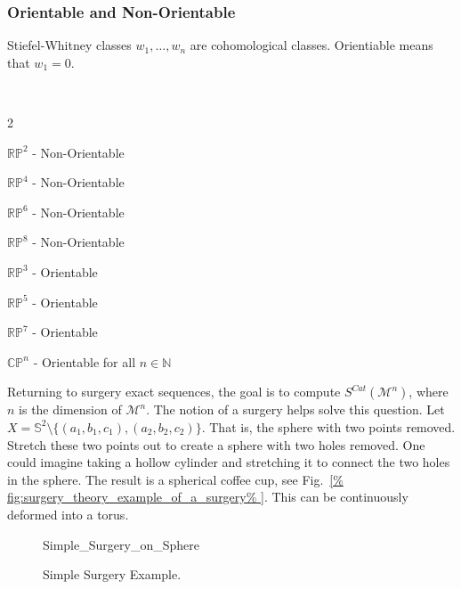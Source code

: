 \documentclass[crop=false,class=book,oneside]{standalone}
\begin{document}
        \subsubsection{Orientable and Non-Orientable}
            Stiefel-Whitney classes $w_{1},\hdots, w_{n}$ are
            cohomological classes.
            Orientiable means that $w_{1}=0$.
            \begin{example}
                \
                \begin{enumerate}
                \end{enumerate}
            \end{example}
            Returning to surgery exact sequences, the goal
            is to compute $S^{Cat}(\mathcal{M}^{n})$, where $n$
            is the dimension of $\mathcal{M}^{n}$. The notion
            of a surgery helps solve this question. Let
            $X=\mathbb{S}^{2}\setminus%
             \{(a_{1},b_{1},c_{1}),(a_{2},b_{2},c_{2})\}$.
            That is, the sphere with two points removed.
            Stretch these two points out to create a sphere
            with two holes removed. One could imagine taking
            a hollow cylinder and stretching it to connect
            the two holes in the sphere. The result is a
            spherical coffee cup, see
            Fig.~\ref{%
                fig:surgery_theory_example_of_a_surgery%
            }.
            This can be continuously deformed into a torus.
            \begin{figure}[H]
                \centering
                \captionsetup{type=figure}
                \resizebox{\textwidth}{!}
                    {{Simple_Surgery_on_Sphere}}
                \caption{Simple Surgery Example.}
                \label{fig:surgery_theory_example_of_a_surgery}
            \end{figure}
\end{document}
